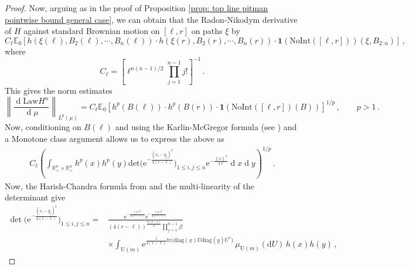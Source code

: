 \documentclass[11pt, reqno]{amsart}
\numberwithin{equation}{section}
\newcommand{\R}{\ensuremath{\mathbb{R}}}
\newcommand{\norm}[1]{\left\lVert#1\right\rVert}
\newcommand{\diff}{\ensuremath{\operatorname{d}\!}}
\begin{document}
\begin{proof}
    Now, arguing as in the proof of Proposition \ref{prop: top line pitman pointwise bound general case}, we can obtain that the Radon-Nikodym derivative of $H$ against standard Brownian motion on $[\ell,r]$ on paths $\xi$ by 
\begin{equation*}
    C_\ell\mathbb{E}_0\left[ h(\xi(\ell), B_2(\ell), \cdots, B_n(\ell))\cdot h(\xi(r), B_2(r), \cdots, B_n(r))\cdot \mathbf{1}(\mathrm{NoInt}([\ell, r]))(\xi, B_{2:n})\right]\,,
\end{equation*}
where
\begin{equation*}
    C_\ell = \left[\ell^{n(n-1)/2}\prod_{j=1}^{n-1}j!\right]^{-1}\,.
\end{equation*}
This gives the norm estimates
\[
\norm{\frac{\diff \mathrm{Law}H^n}{\diff \mu}}_{L^p(\mu)} =  C_\ell\mathbb{E}_0\left[ h^p(B(\ell))\cdot h^p(B(r))\cdot \mathbf{1}(\mathrm{NoInt}([\ell, r])(B))\right]^{1/p}\,,\qquad p>1\,.
\]
Now, conditioning on $B(\ell)$ and using the Karlin-McGregor formula (see \cite{karlin1959coincidence}) and a Monotone class argument allows us to express the above as
\begin{align}\label{eq: L^p expression}
    C_\ell\left(\displaystyle\int_{\R^n_<\times \R^n_<} h^p(x)h^p(y)\mathrm{det}\big(\mathrm{e}^{-\frac{(x_i-y_j)^2}{4(r-\ell)}}\big)_{1\le i , j \le n}\mathrm{e}^{-\frac{\norm{x}^2}{4\ell}}\diff x\diff y\right)^{1/p}\,.
\end{align}
Now, the Harish-Chandra formula from \cite{harish1957differential} and the multi-linearity of the determinant give
\begin{align*}
\det\biggl(\mathrm{e}^{-\frac{(x_i - y_j)^2}{4(r - \ell)}}\biggr)_{1 \le i,j \le n} 
= & \frac{
    \mathrm{e}^{-\frac{\|x\|^2}{4(r - \ell)}} \mathrm{e}^{-\frac{\|y\|^2}{4(r - \ell)}} 
}{
    (4(r - \ell))^{\frac{n(n-1)}{2}} \prod_{j=1}^{n-1} j!
} \\
& \times \int_{\mathrm{U}(m)} 
    \mathrm{e}^{\frac{1}{4(r - \ell)} \mathrm{tr} \bigl( \mathrm{diag}(\underline{x}) U \mathrm{diag}(\underline{y}) U^* \bigr)} 
    \, \mu_{\mathrm{U}(m)}(\mathrm{d}U) \, h(x) h(y) \,,
\end{align*}


\end{proof}
\end{document}
